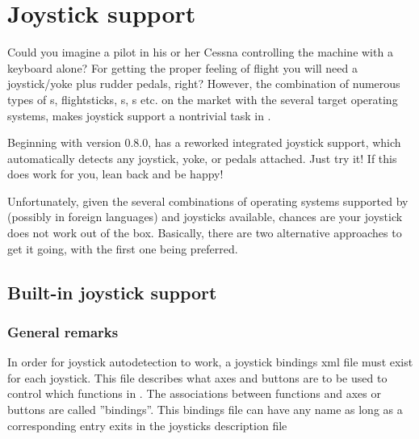 \section{Joystick support\label{joysticksupp}}
Could you imagine a pilot in his or her Cessna controlling the machine with
a keyboard alone? For getting the proper feeling of flight you will need a
joystick/yoke plus rudder pedals, right? However, the combination of
numerous types of s, flightsticks, s,
s etc. on the market with the several target operating systems,
makes joystick support a nontrivial task in \FlightGear{}$\!$.

Beginning with version 0.8.0, \FlightGear{} has a reworked integrated
joystick support, which automatically detects any joystick, yoke, or pedals
attached. Just try it! If this does work for you, lean back and be happy!

Unfortunately, given the several combinations of operating systems supported
by \FlightGear{} (possibly in foreign languages) and joysticks available,
chances are your joystick does not work out of the box. Basically, there are
two alternative approaches to get it going, with the first one being
preferred.


\subsection{Built-in joystick support\label{joystickbuiltin}}

\subsubsection{General remarks\label{generalremarks}}
In order for joystick autodetection to work, a joystick bindings xml file
must exist for each joystick. This file describes what axes and buttons are
to be used to control which functions in \FlightGear{}.  The associations
between functions and axes or buttons are called ''bindings''.  This
bindings file can have any name as long as a corresponding entry exits in
the joysticks description file
\medskip

